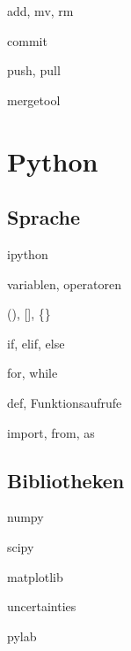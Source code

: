 \documentclass[t]{beamer}
\begin{document}
      \begin{frame}{add, mv, rm}
      \end{frame}
      
      \begin{frame}{commit}
      \end{frame}
      
      \begin{frame}{push, pull}
      \end{frame}
      
      \begin{frame}{mergetool}
      \end{frame}
  \section{Python}
    \begin{frame}
    \end{frame}
    \subsection{Sprache}
      \begin{frame}{ipython}
      \end{frame}
      
      \begin{frame}{variablen, operatoren}
      \end{frame}
      
      \begin{frame}{(), [], \{\}}
      \end{frame}
      
      \begin{frame}{if, elif, else}
      \end{frame}
      
      \begin{frame}{for, while}
      \end{frame}
      
      \begin{frame}{def, Funktionsaufrufe}
      \end{frame}
      
      \begin{frame}{import, from, as}
      \end{frame}
    
    \subsection{Bibliotheken}
      \begin{frame}{numpy}
      \end{frame}
      
      \begin{frame}{scipy}
      \end{frame}
      
      \begin{frame}{matplotlib}
      \end{frame}
      
      \begin{frame}{uncertainties}
      \end{frame}
      
      \begin{frame}{pylab}
      \end{frame}
\end{document}
